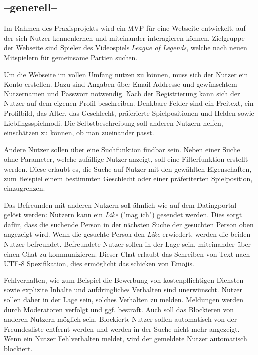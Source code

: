 \subsection{--generell--}
Im Rahmen des Praxisprojekts wird ein MVP %
für eine Webseite entwickelt, auf der sich Nutzer kennenlernen und miteinander interagieren können.
Zielgruppe der Webseite sind Spieler des Videospiels \textit{League of Legends}, welche nach neuen Mitspielern für gemeinsame Partien suchen.

Um die Webseite im vollen Umfang nutzen zu können, muss sich der Nutzer ein Konto erstellen.
Dazu sind Angaben über Email-Addresse und gewünschtem Nutzernamen und Passwort notwendig.
Nach der Registrierung kann sich der Nutzer auf dem eigenen Profil beschreiben.
Denkbare Felder sind ein Freitext, ein Profilbild, das Alter, das Geschlecht, präferierte Spielpositionen und Helden sowie Lieblingsspielmodi.
Die Selbstbeschreibung soll anderen Nutzern helfen, einschätzen zu können, ob man zueinander passt.

Andere Nutzer sollen über eine Suchfunktion findbar sein.
Neben einer Suche ohne Parameter, welche zufällige Nutzer anzeigt, soll eine Filterfunktion erstellt werden.
Diese erlaubt es, die Suche auf Nutzer mit den gewählten Eigenschaften, zum Beispiel einem bestimmten Geschlecht oder einer präferiterten Spielposition, einzugrenzen.

Das Befreunden mit anderen Nutzern soll ähnlich wie auf dem Datingportal  gelöst werden: Nutzern kann ein \textit{Like} ("mag ich") gesendet werden.
Dies sorgt dafür, dass die suchende Person in der nächsten Suche der gesuchten Person oben angezeigt wird.
Wenn die gesuchte Person den \textit{Like} erwiedert, werden die beiden Nutzer befreundet.
Befreundete Nutzer sollen in der Lage sein, miteinander über einen Chat zu kommunizieren.
Dieser Chat erlaubt das Schreiben von Text nach UTF-8 Spezifikation, %
dies ermöglicht das schicken von Emojis.

Fehlverhalten, wie zum Beispiel die Bewerbung von kostenpflichtigen Diensten sowie explizite Inhalte und aufdringliches Verhalten sind unerwünscht.
Nutzer sollen daher in der Lage sein, solches Verhalten zu melden.
Meldungen werden durch Moderatoren verfolgt und ggf. bestraft.
Auch soll das Blockieren von anderen Nutzern möglich sein.
Blockierte Nutzer sollen automatisch von der Freundesliste entfernt werden und werden in der Suche nicht mehr angezeigt.
Wenn ein Nutzer Fehlverhalten meldet, wird der gemeldete Nutzer automatisch blockiert.

